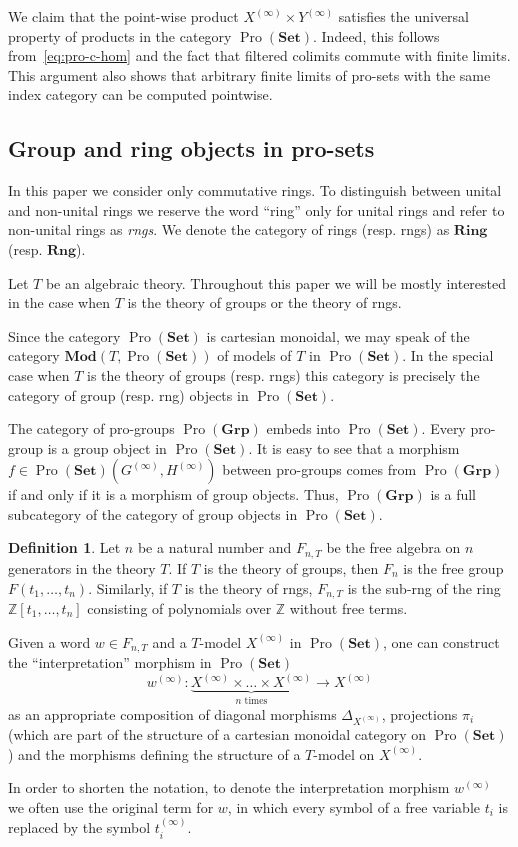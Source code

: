 \documentclass{article}
\theoremstyle{definition}
\newtheorem{df}[lemma]{Definition} \Crefname{df}{Definition}{Definitions}
\theoremstyle{remark}
\DeclareMathOperator{\Pro}{Pro}
\newcommand{\Set}{\mathbf{Set}}
\newcommand{\Group}{\mathbf{Grp}}
\newcommand{\Mod}{\mathbf{Mod}}
\begin{document}
We claim that the point-wise product $X^{(\infty)} \times Y^{(\infty)}$ satisfies the universal property of products in the category $\Pro(\Set)$. Indeed, this follows from~\eqref{eq:pro-c-hom} and the fact that filtered colimits commute with finite limits. This argument also shows that arbitrary finite limits of pro-sets with the same index category can be computed pointwise.

\subsection{Group and ring objects in pro-sets}
In this paper we consider only commutative rings.
To distinguish between unital and non-unital rings we reserve the word ``ring'' only for unital rings and refer to non-unital rings as {\it rngs}.
We denote the category of rings (resp. rngs) as $\textbf{Ring}$ (resp. $\textbf{Rng}$).

Let $T$ be an algebraic theory. Throughout this paper we will be mostly interested in the case when $T$ is the theory of groups or the theory of rngs.

Since the category $\Pro(\Set)$ is cartesian monoidal, we may speak of the category $\Mod(T, \Pro(\Set))$ of models of $T$ in \(\Pro(\Set)\).
In the special case when $T$ is the theory of groups (resp. rngs) this category is precisely the category of group (resp. rng) objects in $\Pro(\Set)$.

The category of pro-groups \(\Pro(\Group)\) embeds into \(\Pro(\Set)\). Every pro-group is a group object in \(\Pro(\Set)\). It is easy to see that a morphism \(f \in \Pro(\Set)(G^{(\infty)}, H^{(\infty)})\) between pro-groups comes from \(\Pro(\Group)\) if and only if it is a morphism of group objects. Thus, $\Pro(\Group)$ is a full subcategory of the category of group objects in $\Pro(\Set)$.

\begin{df} \label{df-pro-set-morphisms} 
 Let $n$ be a natural number and $F_{n, T}$ be the free algebra on $n$ generators in the theory $T$.
 If $T$ is the theory of groups, then $F_n$ is the free group $F(t_1,\ldots, t_n)$.
 Similarly, if $T$ is the theory of rngs, $F_{n, T}$ is the sub-rng of the ring $\mathbb{Z}[t_1,\ldots, t_n]$ consisting of polynomials over $\mathbb{Z}$ without free terms.
 
 Given a word $w \in F_{n, T}$ and a $T$-model $X^{(\infty)}$ in $\Pro(\Set)$, one can construct the ``interpretation'' morphism in $\Pro(\Set)$
 \[ w^{(\infty)} \colon \underbrace{X^{(\infty)} \times \ldots \times X^{(\infty)}}_{n\text{ times}} \to X^{(\infty)}\]
 as an appropriate composition of diagonal morphisms $\Delta_{X^{(\infty)}}$, projections $\pi_i$ 
 (which are part of the structure of a cartesian monoidal category on $\Pro(\Set)$) 
 and the morphisms defining the structure of a $T$-model on $X^{(\infty)}$.
 
 In order to shorten the notation, to denote the interpretation morphism $w^{(\infty)}$ we often use the original term for $w$,
  in which every symbol of a free variable $t_i$ is replaced by the symbol $t_i^{(\infty)}$.
\end{df}
\end{document}
